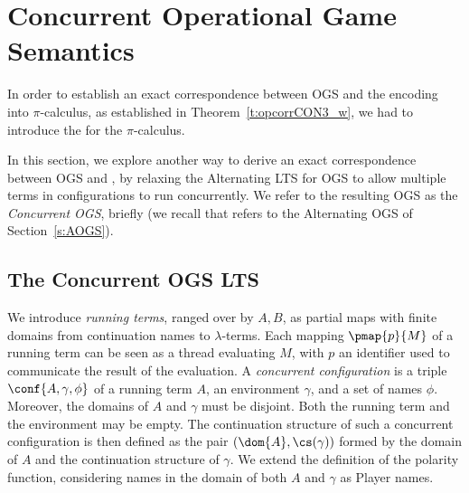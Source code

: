 \section{Concurrent Operational Game Semantics}
\label{s:cogs}

In order to establish an exact correspondence between OGS and the encoding into $\pi$-calculus,
as established in Theorem~\ref{t:opcorrCON3_w}, we had to introduce the \opLTS for the 
$\pi$-calculus.

In this section, we explore another way to derive an exact correspondence between OGS and \piI,
by relaxing the Alternating LTS for OGS to allow multiple terms in 
configurations to run concurrently. 
We refer to the resulting OGS as the \emph{Concurrent OGS}, briefly \COGS (we
recall that  \AOGS refers to the Alternating  OGS of Section~\ref{s:AOGS}).  

\subsection{The Concurrent OGS LTS}
\label{ss:cs_cogs-lts}


We introduce \emph{running terms}, ranged over by $A,B$,
as partial maps with finite domains 
from continuation names to $\lambda$-terms.
Each mapping $\pmap{p}{M}$ of a running term can be seen as
a thread evaluating $M$, with $p$ an identifier
used to communicate the result of the evaluation.
%
A \emph{concurrent configuration} is a triple $ \conf{A,\gamma,\phi}$ 
of a running term $A$, an environment 
$\gamma$, and a set of names $\phi$.
Moreover, the domains of $A$ and $\gamma$
must be disjoint.
Both the running term and the environment may be empty.
The continuation structure of such a concurrent configuration
is then defined as the pair $(\dom{A},\cs(\gamma))$
formed by the domain of $A$ and the continuation structure of $\gamma$.
We extend the definition of the polarity function,
considering names in the domain of both $A$ and $\gamma$ as Player names. 
%

% 


